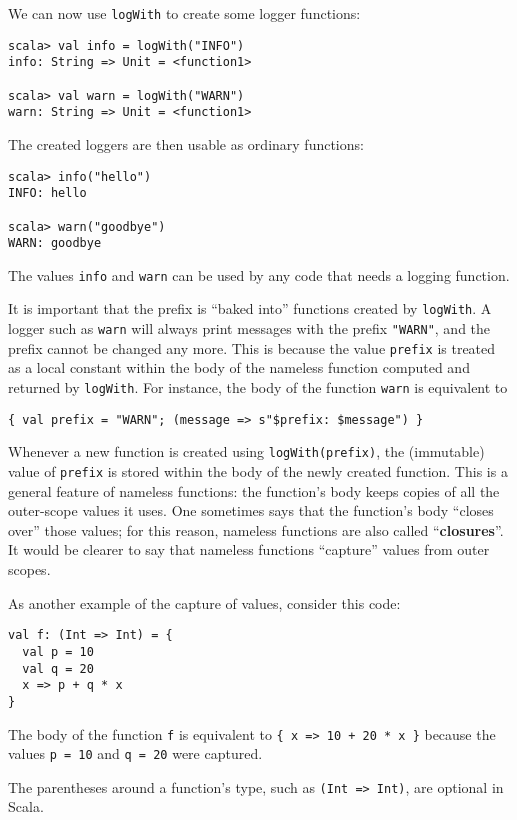 We can now use \lstinline!logWith! to create some logger functions:
\begin{lstlisting}
scala> val info = logWith("INFO")
info: String => Unit = <function1>

scala> val warn = logWith("WARN")
warn: String => Unit = <function1>
\end{lstlisting}
The created loggers are then usable as ordinary functions:
\begin{lstlisting}
scala> info("hello")
INFO: hello

scala> warn("goodbye")
WARN: goodbye
\end{lstlisting}
The values \lstinline!info! and \lstinline!warn! can be used by
any code that needs a logging function.

It is important that the prefix is \textsf{``}baked into\textsf{''} functions created
by \lstinline!logWith!. A logger such as \lstinline!warn! will always
print messages with the prefix \lstinline!"WARN"!, and the prefix
cannot be changed any more. This is because the value \lstinline!prefix!
is treated as a local constant within the body of the nameless function
computed and returned by \lstinline!logWith!. For instance, the body
of the function \lstinline!warn! is equivalent to
\begin{lstlisting}
{ val prefix = "WARN"; (message => s"$prefix: $message") }
\end{lstlisting}
Whenever a new function is created using \lstinline!logWith(prefix)!,
the (immutable) value of \lstinline!prefix! is stored within the
body of the newly created function. This is a general feature of nameless
functions: the function\textsf{'}s body keeps copies of all the outer-scope
values it uses. One sometimes says that the function\textsf{'}s body \textsf{``}closes
over\textsf{''} those values; for this reason, nameless functions are also
called \textsf{``}\textbf{closures}\textsf{''}. It would be clearer
to say that nameless functions \textsf{``}capture\textsf{''} values from outer scopes.

As another example of the capture of values, consider this code:
\begin{lstlisting}
val f: (Int => Int) = {
  val p = 10
  val q = 20
  x => p + q * x
}
\end{lstlisting}
The body of the function \lstinline!f! is equivalent to \lstinline!{ x => 10 + 20 * x }!
because the values \lstinline!p = 10! and \lstinline!q = 20! were
captured.

The parentheses around a function\textsf{'}s type, such as \lstinline!(Int => Int)!,
are optional in Scala. 

